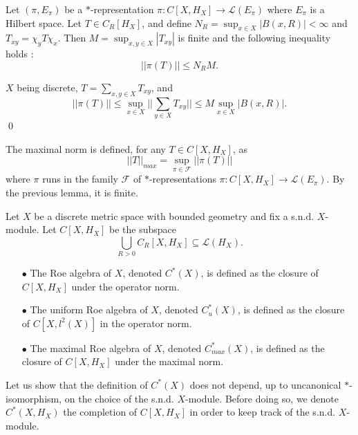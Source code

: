 \begin{lem}
Let $(\pi, E_\pi)$ be a $*$-representation $\pi : C[X,H_X]\rightarrow \mathcal L(E_\pi)$ where $E_\pi$ is a Hilbert space. Let $T\in C_R[H_X]$, and define $N_R =\sup_{x\in X} |B(x,R)|<\infty$ and $T_{xy} = \chi_y T \chi_x$. Then $M=\sup_{x,y\in X} |T_{xy}|$ is finite and the following inequality holds :
\[||\pi(T)||\leq N_R M.\] 
\end{lem}
\begin{dem}
$X$ being discrete, $T=\sum_{x,y\in X} T_{xy}$, and 
\[||\pi(T)||\leq \sup_{x\in X} ||\sum_{y\in X} T_{xy}||\leq M \sup_{x\in X} |B(x,R)|.\]
\qed
\end{dem}

The maximal norm is defined, for any $T\in C[X,H_X]$, as 
\[||T||_{max} = \sup_{\pi\in\mathcal F} ||\pi(T)||\]
where $\pi$ runs in the family $\mathcal F$ of $*$-representations $\pi : C[X,H_X]\rightarrow \mathcal L(E_\pi)$. By the previous lemma, it is finite. 

\begin{definition}
Let $X$ be a discrete metric space with bounded geometry and fix a s.n.d. $X$-module. Let $C[X,H_X] $ be the subspace 
\[\bigcup_{R>0} C_R[X,H_X]\subseteq \mathcal L(H_X).\] 
\begin{itemize}
\item[$\bullet$] The Roe algebra of $X$, denoted $C^*(X)$, is defined as the closure of $C[X,H_X]$ under the operator norm.
\item[$\bullet$] The uniform Roe algebra of $X$, denoted $C_u^*(X)$, is defined as the closure of $C[X,l^2(X)]$ in the operator norm.
\item[$\bullet$] The maximal Roe algebra of $X$, denoted $C_{max}^*(X)$, is defined as the closure of $C[X,H_X]$ under the maximal norm. 
\end{itemize}
\end{definition}

Let us show that the definition of $C^*(X)$ does not depend, up to uncanonical $*$-isomorphism, on the choice of the s.n.d. $X$-module. Before doing so, we denote $C^*(X,H_X)$ the completion of $C[X,H_X]$ in order to keep track of the s.n.d. $X$-module.

